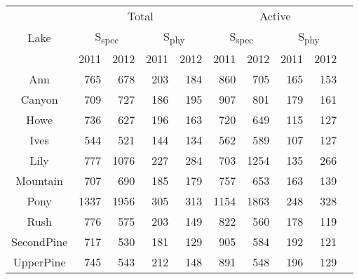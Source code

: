\begin{table}[ht]
\centering
\begin{tabular}{c r r r r  r r r r r }
  \hline
\hline
   & \multicolumn{4}{c}{Total} & 
                      \multicolumn{4}{c}{Active} \\
 Lake & \multicolumn{2}{c}{S\textsubscript{spec}} & 
                      \multicolumn{2}{c}{S\textsubscript{phy}} & 
                      \multicolumn{2}{c}{S\textsubscript{spec}} &
                      \multicolumn{2}{c}{S\textsubscript{phy}} \\
  & 2011 & 2012 & 2011 & 2012 & 
                      2011 & 2012 & 2011 & 2012 \\
 \hline
Ann & 765 & 678 & 203 & 184 & 860 & 705 & 165 & 153 &  \\ 
  Canyon & 709 & 727 & 186 & 195 & 907 & 801 & 179 & 161 &  \\ 
  Howe & 736 & 627 & 196 & 163 & 720 & 649 & 115 & 127 &  \\ 
  Ives & 544 & 521 & 144 & 134 & 562 & 589 & 107 & 127 &  \\ 
  Lily & 777 & 1076 & 227 & 284 & 703 & 1254 & 135 & 266 &  \\ 
  Mountain & 707 & 690 & 185 & 179 & 757 & 653 & 163 & 139 &  \\ 
  Pony & 1337 & 1956 & 305 & 313 & 1154 & 1863 & 248 & 328 &  \\ 
  Rush & 776 & 575 & 203 & 149 & 822 & 560 & 178 & 119 &  \\ 
  SecondPine & 717 & 530 & 181 & 129 & 905 & 584 & 192 & 121 &  \\ 
  UpperPine & 745 & 543 & 212 & 148 & 891 & 548 & 196 & 129 &  \\ 
   \hline
\end{tabular}
\end{table}
